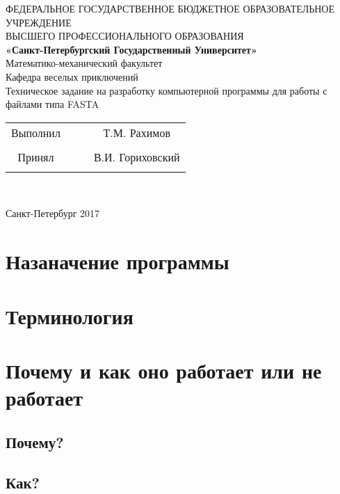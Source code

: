 \documentclass[a4paper]{article}
\begin{document}
	
	\begin{center}
		\hfill \break
		\hfill \break
		\footnotesize{ФЕДЕРАЛЬНОЕ ГОСУДАРСТВЕННОЕ БЮДЖЕТНОЕ ОБРАЗОВАТЕЛЬНОЕ УЧРЕЖДЕНИЕ}\\ 
		\footnotesize{ВЫСШЕГО ПРОФЕССИОНАЛЬНОГО ОБРАЗОВАНИЯ}\\
		\small{\textbf{«Санкт-Петербургский Государственный Университет»}}\\
		\hfill \break
		\hfill \break
		\normalsize{Математико-механический факультет}\\
		\hfill \break
		\hfill \break
		\normalsize{Кафедра веселых приключений}\\
		\hfill\break
		\hfill \break
		\hfill \break
		\hfill \break
		\hfill \break
		\large{Техническое задание на разработку компьютерной программы для работы с файлами типа FASTA}\\
		\hfill \break
		\hfill \break
		\hfill \break
		\hfill \break
		\hfill \break
		\hfill \break
	\end{center}
	
	\hfill \break
	
	\normalsize{ 
		\begin{tabular}{cccc}
			
			Выполнил & \underline{\hspace{3cm}} & &Т.М. Рахимов \\\\
			Принял & \underline{\hspace{3cm}}& &  В.И. Гориховский \\\\
		\end{tabular}
	}\\
	\hfill \break
	\hfill \break
	\hfill \break
	\hfill \break
	\hfill \break
	\hfill \break
	\begin{center} Санкт-Петербург 2017 \end{center}
	\thispagestyle{empty} %
	
	
	\newpage
	
	\tableofcontents %
	\newpage
	\begin{abstract}
	\end{abstract}
	
	\section{Назаначение программы}
	
	\section{Терминология}
	
	\section{Почему и как оно работает или не работает}
	\subsection{Почему?}
	
	\subsection{Как?}
	
	
	
\end{document}

